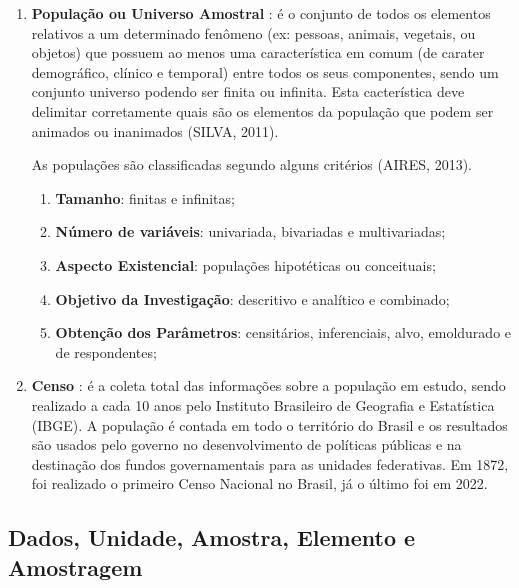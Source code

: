 \begin{enumerate}
\item \textbf{População ou Universo Amostral} : é o conjunto de todos os elementos relativos
a um determinado fenômeno (ex: pessoas, animais, vegetais, ou objetos) que possuem ao menos uma característica em comum (de carater demográfico, clínico e temporal) entre todos os seus componentes, sendo um conjunto universo podendo ser
finita ou infinita. Esta cacterística deve delimitar corretamente quais são os elementos da população que podem ser animados ou inanimados (SILVA, 2011).\vskip0.3cm

As populações são classificadas segundo alguns critérios (AIRES, 2013).

\begin{enumerate}
\item \textbf{Tamanho}: finitas e infinitas;
\item \textbf{Número de variáveis}: univariada, bivariadas e multivariadas;
\item \textbf{Aspecto Existencial}: populações hipotéticas ou conceituais;
\item \textbf{Objetivo da Investigação}: descritivo e analítico e combinado;
\item \textbf{Obtenção dos Parâmetros}: censitários, inferenciais, alvo, e\-mol\-du\-ra\-do e de respondentes;
\end{enumerate}

\item \textbf{Censo} : é a coleta total das informações sobre a
população em estudo, sendo realizado a cada 10 anos pelo Instituto
Brasileiro de Geografia e Estatística (IBGE). A população é contada
em todo o território do Brasil e os resultados são usados
pelo governo no desenvolvimento de políticas públicas e na
destinação dos fundos governamentais para as unidades federativas.
Em 1872, foi realizado o primeiro Censo Nacional no Brasil, já o último foi em 2022.
\end{enumerate}

\subsection{Dados, Unidade, Amostra, Elemento e Amostragem}

